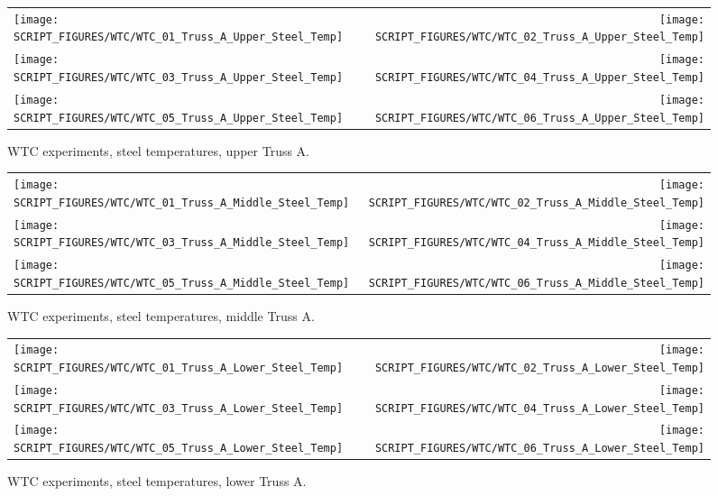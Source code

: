 \begin{figure}[p]
\begin{tabular*}{\textwidth}{l@{\extracolsep{\fill}}r}
\texttt{[image: SCRIPT\_FIGURES/WTC/WTC\_01\_Truss\_A\_Upper\_Steel\_Temp]} &
\texttt{[image: SCRIPT\_FIGURES/WTC/WTC\_02\_Truss\_A\_Upper\_Steel\_Temp]} \\
\texttt{[image: SCRIPT\_FIGURES/WTC/WTC\_03\_Truss\_A\_Upper\_Steel\_Temp]} &
\texttt{[image: SCRIPT\_FIGURES/WTC/WTC\_04\_Truss\_A\_Upper\_Steel\_Temp]} \\
\texttt{[image: SCRIPT\_FIGURES/WTC/WTC\_05\_Truss\_A\_Upper\_Steel\_Temp]} &
\texttt{[image: SCRIPT\_FIGURES/WTC/WTC\_06\_Truss\_A\_Upper\_Steel\_Temp]}
\end{tabular*}
\caption[WTC experiments, steel temperatures, upper Truss A]{WTC experiments, steel temperatures, upper Truss A.}
\label{NIST_WTC_Truss_A_Upper_Steel_Temp}
\end{figure}

\begin{figure}[p]
\begin{tabular*}{\textwidth}{l@{\extracolsep{\fill}}r}
\texttt{[image: SCRIPT\_FIGURES/WTC/WTC\_01\_Truss\_A\_Middle\_Steel\_Temp]} &
\texttt{[image: SCRIPT\_FIGURES/WTC/WTC\_02\_Truss\_A\_Middle\_Steel\_Temp]} \\
\texttt{[image: SCRIPT\_FIGURES/WTC/WTC\_03\_Truss\_A\_Middle\_Steel\_Temp]} &
\texttt{[image: SCRIPT\_FIGURES/WTC/WTC\_04\_Truss\_A\_Middle\_Steel\_Temp]} \\
\texttt{[image: SCRIPT\_FIGURES/WTC/WTC\_05\_Truss\_A\_Middle\_Steel\_Temp]} &
\texttt{[image: SCRIPT\_FIGURES/WTC/WTC\_06\_Truss\_A\_Middle\_Steel\_Temp]}
\end{tabular*}
\caption[WTC experiments, steel temperatures, middle Truss A]{WTC experiments, steel temperatures, middle Truss A.}
\label{NIST_WTC_Truss_A_Middle_Steel_Temp}
\end{figure}

\begin{figure}[p]
\begin{tabular*}{\textwidth}{l@{\extracolsep{\fill}}r}
\texttt{[image: SCRIPT\_FIGURES/WTC/WTC\_01\_Truss\_A\_Lower\_Steel\_Temp]} &
\texttt{[image: SCRIPT\_FIGURES/WTC/WTC\_02\_Truss\_A\_Lower\_Steel\_Temp]} \\
\texttt{[image: SCRIPT\_FIGURES/WTC/WTC\_03\_Truss\_A\_Lower\_Steel\_Temp]} &
\texttt{[image: SCRIPT\_FIGURES/WTC/WTC\_04\_Truss\_A\_Lower\_Steel\_Temp]} \\
\texttt{[image: SCRIPT\_FIGURES/WTC/WTC\_05\_Truss\_A\_Lower\_Steel\_Temp]} &
\texttt{[image: SCRIPT\_FIGURES/WTC/WTC\_06\_Truss\_A\_Lower\_Steel\_Temp]}
\end{tabular*}
\caption[WTC experiments, steel temperatures, lower Truss A]{WTC experiments, steel temperatures, lower Truss A.}
\label{NIST_WTC_Truss_A_Lower_Steel_Temp}
\end{figure}

